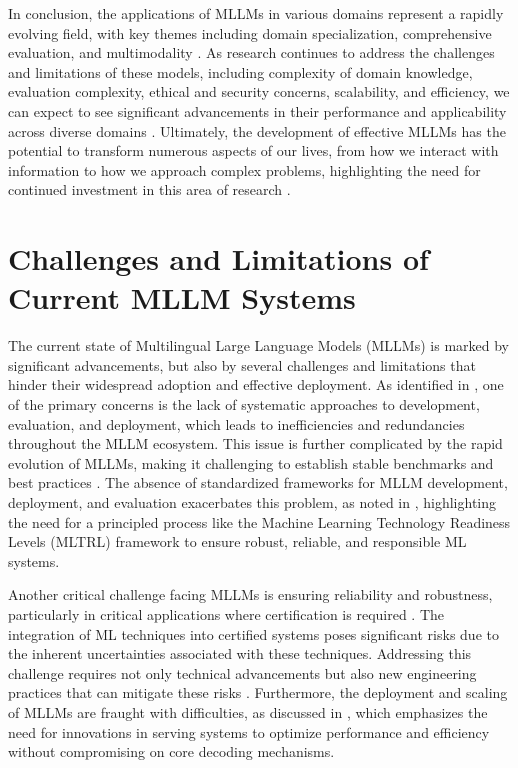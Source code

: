 \documentclass[conference]{IEEEtran}
\begin{document}
In conclusion, the applications of MLLMs in various domains represent a rapidly evolving field, with key themes including domain specialization, comprehensive evaluation, and multimodality \cite{b19}. As research continues to address the challenges and limitations of these models, including complexity of domain knowledge, evaluation complexity, ethical and security concerns, scalability, and efficiency, we can expect to see significant advancements in their performance and applicability across diverse domains \cite{b20}. Ultimately, the development of effective MLLMs has the potential to transform numerous aspects of our lives, from how we interact with information to how we approach complex problems, highlighting the need for continued investment in this area of research \cite{b21}.

\section{Challenges and Limitations of Current MLLM Systems}
The current state of Multilingual Large Language Models (MLLMs) is marked by significant advancements, but also by several challenges and limitations that hinder their widespread adoption and effective deployment. As identified in \cite{b1}, one of the primary concerns is the lack of systematic approaches to development, evaluation, and deployment, which leads to inefficiencies and redundancies throughout the MLLM ecosystem. This issue is further complicated by the rapid evolution of MLLMs, making it challenging to establish stable benchmarks and best practices \cite{b2}. The absence of standardized frameworks for MLLM development, deployment, and evaluation exacerbates this problem, as noted in \cite{b3}, highlighting the need for a principled process like the Machine Learning Technology Readiness Levels (MLTRL) framework \cite{b4} to ensure robust, reliable, and responsible ML systems.

Another critical challenge facing MLLMs is ensuring reliability and robustness, particularly in critical applications where certification is required \cite{b5}. The integration of ML techniques into certified systems poses significant risks due to the inherent uncertainties associated with these techniques. Addressing this challenge requires not only technical advancements but also new engineering practices that can mitigate these risks \cite{b6}. Furthermore, the deployment and scaling of MLLMs are fraught with difficulties, as discussed in \cite{b7}, which emphasizes the need for innovations in serving systems to optimize performance and efficiency without compromising on core decoding mechanisms.
\end{document}
